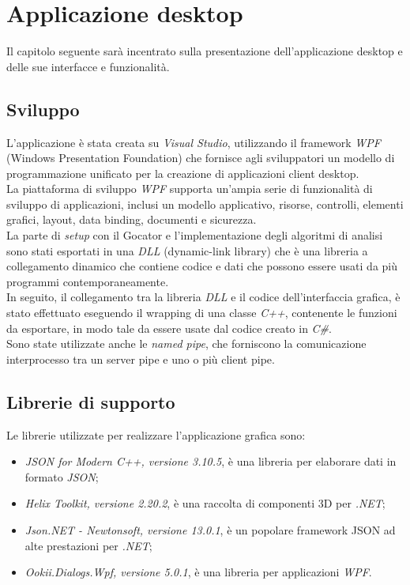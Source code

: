 \chapter{Applicazione desktop}
\label{Cha:desktop}
\thispagestyle{empty}

Il capitolo seguente sarà incentrato sulla presentazione dell'applicazione desktop e delle sue interfacce e funzionalità.

\section{Sviluppo}
L'applicazione è stata creata su \textit{Visual Studio}, utilizzando il framework \textit{WPF} (Windows Presentation Foundation) che fornisce agli sviluppatori un modello di programmazione unificato per la creazione di applicazioni client desktop.\\
\newline
La piattaforma di sviluppo \textit{WPF} supporta un'ampia serie di funzionalità di sviluppo di applicazioni, inclusi un modello applicativo, risorse, controlli, elementi grafici, layout, data binding, documenti e sicurezza.\\
\newline
La parte di \textit{setup} con il Gocator e l'implementazione degli algoritmi di analisi sono stati esportati in una \textit{DLL} (dynamic-link library) che è una libreria a collegamento dinamico che contiene codice e dati che possono essere usati da più programmi contemporaneamente.\\
\newline
In seguito, il collegamento tra la libreria \textit{DLL} e il codice dell'interfaccia grafica, è stato effettuato eseguendo il wrapping di una classe \textit{C++}, contenente le funzioni da esportare, in modo tale da essere usate dal codice creato in \textit{C\#}.\\
\newline
Sono state utilizzate anche le \textit{named pipe}, che forniscono la comunicazione interprocesso tra un server pipe e uno o più client pipe.

\section{Librerie di supporto}
Le librerie utilizzate per realizzare l'applicazione grafica sono:

\begin{itemize}
	\item \textit{JSON for Modern C++, versione 3.10.5}, è una libreria per elaborare dati in formato \textit{JSON};
	\item \textit{Helix Toolkit, versione 2.20.2}, è una raccolta di componenti 3D per \textit{.NET};
	\item \textit{Json.NET - Newtonsoft, versione 13.0.1}, è un popolare framework JSON ad alte prestazioni per \textit{.NET};
	\item \textit{Ookii.Dialogs.Wpf, versione 5.0.1}, è una libreria per applicazioni \textit{WPF}.
\end{itemize}

